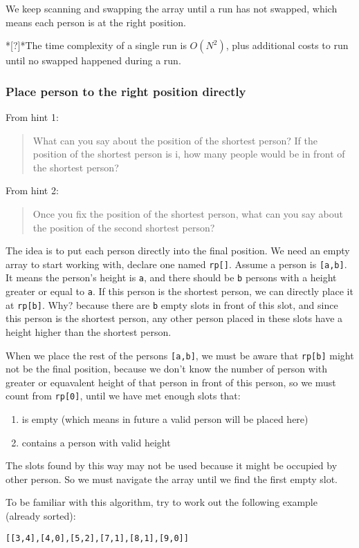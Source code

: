 \documentclass[12pt]{article}
\begin{document}
We keep scanning and swapping the array until a run has not swapped, which means each person is at the right position.

*[?]*The time complexity of a single run is \(O(N^2)\), plus additional costs to run until no swapped happened during a run.
\subsubsection{Place person to the right position directly}
\label{sec:org923eab8}
From hint 1:
\begin{quote}
What can you say about the position of the shortest person? 
If the position of the shortest person is i, how many people would be in front of the shortest person?
\end{quote}

From hint 2:
\begin{quote}
Once you fix the position of the shortest person, what can you say about the position of the second shortest person?
\end{quote}

The idea is to put each person directly into the final position. We need an empty array to start working with, declare one named \texttt{rp[]}. Assume a person is \texttt{[a,b]}. It means the person's height is \texttt{a}, and there should be \texttt{b} persons with a height greater or equal to \texttt{a}. If this person is the shortest person, we can directly place it at \texttt{rp[b]}. Why? because there are \texttt{b} empty slots in front of this slot, and since this person is the shortest person, any other person placed in these slots have a height higher than the shortest person.

When we place the rest of the persons \texttt{[a,b]}, we must be aware that \texttt{rp[b]} might not be the final position, because we don't know the number of person with greater or equavalent height of that person in front of this person, so we must count from \texttt{rp[0]}, until we have met enough slots that:
\begin{enumerate}
\item is empty (which means in future a valid person will be placed here)
\item contains a person with valid height
\end{enumerate}
The slots found by this way may not be used because it might be occupied by other person. So we must navigate the array until we find the first empty slot.

To be familiar with this algorithm, try to work out the following example (already sorted):
\begin{verbatim}
[[3,4],[4,0],[5,2],[7,1],[8,1],[9,0]]
\end{verbatim}
\end{document}
